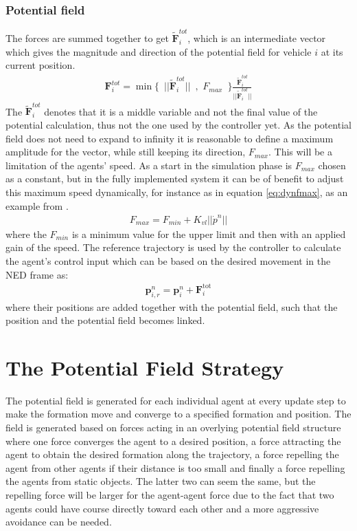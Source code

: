 \documentclass[a4paper,conference]{IEEEtran}
\begin{document}
\subsubsection{Potential field}
The forces are summed together to get $\tilde{\mathbf{F}}_i^{tot}$,
which is an intermediate vector which gives the magnitude and
direction of the potential field for vehicle $i$ at its current
position.
\begin{align}
  \mathbf{F}_i^{tot} = \min\{\,\,\,||\tilde{\mathbf{F}}_i^{tot}||\,\,\,,\,\,F_{max}\,\,\,\}\frac{\tilde{\mathbf{F}}_i^{tot}}{||\tilde{\mathbf{F}}_i^{tot}||}
\end{align}
The $\tilde{\mathbf{F}}_i^{tot}$ denotes that it is a middle variable
and not the final value of the potential calculation, thus not the one
used by the controller yet.  As the potential field does not need to
expand to infinity it is reasonable to define a maximum amplitude for
the vector, while still keeping its direction, $F_{max}$. This will be
a limitation of the agents' speed. As a start in the simulation phase
is $F_{max}$ chosen as a constant, but in the fully implemented system
it can be of benefit to adjust this maximum speed dynamically, for
instance as in equation \ref{eq:dynfmax}, as an example from
\citep{UAVff3dpf}.
\begin{align}
F_{max} = F_{min} + K_{vl}||\dot{p}^n||
\label{eq:dynfmax}
\end{align}
where the $F_{min}$ is a minimum value for the upper limit and then
with an applied gain of the speed.  The reference trajectory is used
by the controller to calculate the agent's control input which can be
based on the desired movement in the NED frame as:
\begin{align}
  \mathbf{p}_{i,r}^n = \mathbf{p}_i^n + \mathbf{F}_i ^\text{tot}
\end{align}
where their positions are added together with the potential field,
such that the position and the potential field becomes linked.

\section{The Potential Field Strategy}
 The potential field is
generated for each individual agent at every update step to make the
formation move and converge to a specified formation and position. The
field is generated based on forces acting in an overlying potential
field structure where one force converges the agent to a desired
position, a force attracting the agent to obtain the desired formation
along the trajectory, a force repelling the agent from other agents if
their distance is too small and finally a force repelling the agents
from static objects. The latter two can seem the same, but the
repelling force will be larger for the agent-agent force due to the
fact that two agents could have course directly toward each other and
a more aggressive avoidance can be needed.
\end{document}
